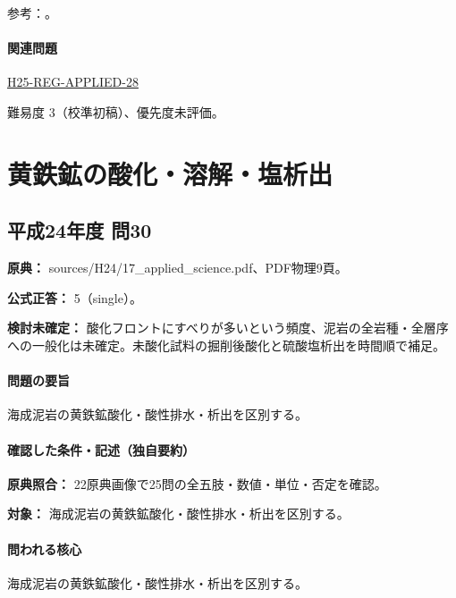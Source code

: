 \par 参考：\cite{eng52_soil_phases}。

\paragraph{関連問題} \hyperref[q:h25-reg-applied-28]{H25-REG-APPLIED-28}

\par 難易度 3（校準初稿）、優先度未評価。

\section{黄鉄鉱の酸化・溶解・塩析出}

\subsection{平成24年度 問30}
\label{q:h24-reg-applied-30}

\noindent\textbf{原典：} sources/H24/17\_applied\_science.pdf、PDF物理9頁。

\textbf{公式正答：} 5（single）。

\par\textbf{検討未確定：} 酸化フロントにすべりが多いという頻度、泥岩の全岩種・全層序への一般化は未確定。未酸化試料の掘削後酸化と硫酸塩析出を時間順で補足。

\paragraph{問題の要旨} 海成泥岩の黄鉄鉱酸化・酸性排水・析出を区別する。

\paragraph{確認した条件・記述（独自要約）}\mbox{}\par

\noindent\textbf{原典照合：} 22原典画像で25問の全五肢・数値・単位・否定を確認。\par

\noindent\textbf{対象：} 海成泥岩の黄鉄鉱酸化・酸性排水・析出を区別する。\par

\paragraph{問われる核心} 海成泥岩の黄鉄鉱酸化・酸性排水・析出を区別する。

